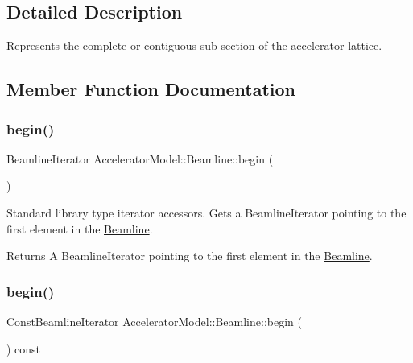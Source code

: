 \subsection{Detailed Description}
Represents the complete or contiguous sub-\/section of the accelerator lattice. 

\subsection{Member Function Documentation}
\mbox{\label{classAcceleratorModel_1_1Beamline_a1cccebda06318f2ed33b12a19cf7acba}} 
\subsubsection{\texorpdfstring{begin()}{begin()}\hspace{0.1cm}{\footnotesize\ttfamily [1/2]}}
{\footnotesize\ttfamily Beamline\+Iterator Accelerator\+Model\+::\+Beamline\+::begin (\begin{DoxyParamCaption}{ }\end{DoxyParamCaption})\hspace{0.3cm}{\ttfamily [inline]}}

Standard library type iterator accessors. Gets a Beamline\+Iterator pointing to the first element in the \hyperlink{classAcceleratorModel_1_1Beamline}{Beamline}. \begin{DoxyReturn}{Returns}
A Beamline\+Iterator pointing to the first element in the \hyperlink{classAcceleratorModel_1_1Beamline}{Beamline}. 
\end{DoxyReturn}
\mbox{\label{classAcceleratorModel_1_1Beamline_a1580e7da07af01517c3d552464b267ed}} 
\subsubsection{\texorpdfstring{begin()}{begin()}\hspace{0.1cm}{\footnotesize\ttfamily [2/2]}}
{\footnotesize\ttfamily Const\+Beamline\+Iterator Accelerator\+Model\+::\+Beamline\+::begin (\begin{DoxyParamCaption}{ }\end{DoxyParamCaption}) const\hspace{0.3cm}{\ttfamily [inline]}}

